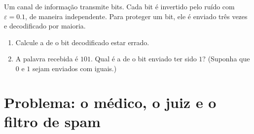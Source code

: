 \begin{exercise}[$\star\star\star$]\label{exo:g12:condprob:8}
Um canal de informação transmite bits. Cada bit é invertido pelo ruído com
 $\varepsilon = 0.1$, de maneira independente. Para proteger
um bit, ele é enviado três vezes e decodificado por maioria.
\begin{enumerate}
  \item Calcule a  de o bit decodificado estar errado.
  \item A palavra recebida é $101$. Qual é a  de o bit
        enviado ter sido $1$? (Suponha que $0$ e $1$ sejam enviados com
         iguais.)
\end{enumerate}
\end{exercise}

\section{Problema: o médico, o juiz e o filtro de spam}

